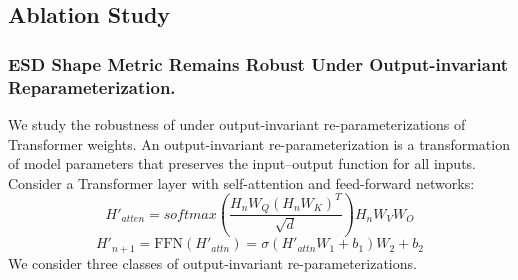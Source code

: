\subsection{Ablation Study}
\subsubsection{ESD Shape Metric Remains Robust Under Output-invariant Reparameterization.} 
We study the robustness of \ALPHAHILL under output-invariant re-parameterizations of Transformer weights. An output-invariant re-parameterization is a transformation of model parameters that preserves the input–output function for all inputs.
Consider a Transformer layer with self-attention and feed-forward networks:
\begin{equation}
H'_{atten}=softmax(\frac{H_n W_Q (H_n W_K)^T}{\sqrt{d}})H_nW_VW_O
\label{attn}
\end{equation}
\begin{equation}
    H'_{n+1}= \mathrm{FFN}(H'_{attn}) = \sigma(H'_{attn} W_1 + b_1) W_2 + b_2
    \label{ffn}
\end{equation}
We consider three classes of output-invariant re-parameterizations.
